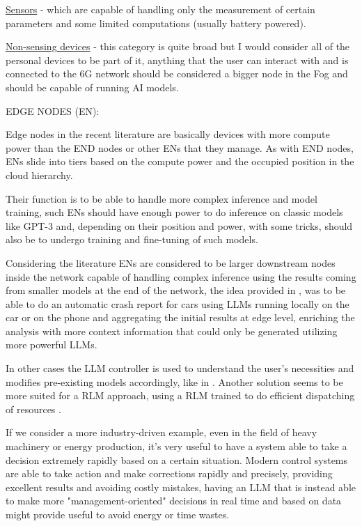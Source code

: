 \underline{Sensors} - which are capable of handling only the measurement of certain parameters and
some limited computations (usually battery powered).

\underline{Non-sensing devices} - this category is quite broad but I would consider all of the personal
devices to be part of it, anything that the user can interact with and is connected to the 6G network should be considered a bigger node in the Fog and should be capable of running AI models.

\bigskip
\noindent
EDGE NODES (EN):
\label{ssec:edge-nodes}

Edge nodes in the recent literature are basically devices with more compute power than the END nodes
or other ENs that they manage. As with END nodes, ENs slide into tiers based on the compute power
and the occupied position in the cloud hierarchy.

Their function is to be able to handle more complex inference and model training, such ENs
should have enough power to do inference on classic models like GPT-3 and, depending on their
position and power, with some tricks, should also be to undergo training and fine-tuning of such models.

Considering the literature ENs are considered to be larger downstream nodes inside the
network capable of handling complex inference using the results coming from smaller models at the
end of the network, the idea provided in \cite{pga}, was to be able to do an automatic crash report
for cars using LLMs running locally on the car or on the phone and aggregating the initial results
at edge level, enriching the analysis with more context information that could only be generated
utilizing more powerful LLMs.

In other cases the LLM controller is used to understand the user's necessities and modifies
pre-existing models accordingly, like in \cite{ai4ci}. Another solution seems to be more suited for a RLM
approach, using a RLM trained to do efficient dispatching of resources \cite{llm6G}.

If we consider a more industry-driven example, even in the field of heavy machinery or energy
production, it's very useful to have a system able to take a decision extremely rapidly based on a
certain situation. Modern control systems are able to take action and make corrections rapidly and
precisely, providing excellent results and avoiding costly mistakes, having an LLM that is instead able
to make more "management-oriented" decisions in real time and based on data might provide useful to avoid
energy or time wastes.

